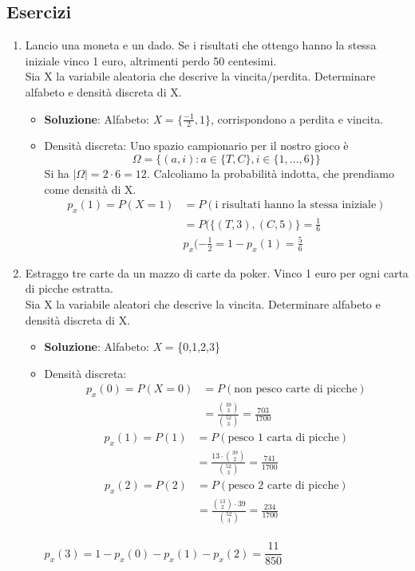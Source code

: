 \documentclass{report}
\begin{document}
\subsection{Esercizi}
\begin{enumerate}
    \item Lancio una moneta e un dado. Se i risultati che ottengo hanno la stessa iniziale vinco 1 euro, altrimenti perdo 50 centesimi.\\ 
    Sia X la variabile aleatoria che descrive la vincita/perdita. Determinare alfabeto e densità discreta di X.
    \begin{itemize}
        \item \textbf{Soluzione}: Alfabeto: \textit{X} = \(\{\frac{-1}{2}, 1\}\), corrispondono a perdita e vincita.\\
    \item Densità discreta: Uno spazio campionario per il nostro gioco è \[\Omega = \{(a,i): a \in \{T,C\}, i \in \{1,...,6\}\}\]
    Si ha \(|\Omega| = 2 \cdot 6 = 12\). Calcoliamo la probabilità indotta, che prendiamo come densità di X.
    \begin{align}
        p_x(1) = P(X = 1) & = P(\text{i risultati hanno la stessa iniziale})\\
        & = P(\{(T,3), (C,5)\} = \frac{1}{6}\\
        & p_x(- \frac{1}{2} = 1 - p_x(1) = \frac{5}{6}
    \end{align}
    \end{itemize}
    \item Estraggo tre carte da un mazzo di carte da poker. Vinco 1 euro per ogni carta di picche estratta.\\
    Sia X la variabile aleatori che descrive la vincita. Determinare alfabeto e densità discreta di X.
    \begin{itemize}
        \item \textbf{Soluzione}: Alfabeto: \textit{X} = \{0,1,2,3\}
        \item Densità discreta:
        \begin{align}
            p_x(0) = P(X = 0) & = P (\text{non pesco carte di picche})\\
            & = \frac{\binom{39}{3}}{\binom{52}{3}} = \frac{703}{1700}
        \end{align}
        \begin{align}
            p_x(1) = P(1) & = P (\text{pesco 1 carta di picche})\\
            & = \frac{13 \cdot \binom{39}{2}}{\binom{52}{3}} = \frac{741}{1700}
        \end{align}
        \begin{align}
            p_x(2) = P(2) & = P (\text{pesco 2 carte di picche})\\
            & = \frac{\binom{13}{2} \cdot 39 }{\binom{52}{3}} = \frac{234}{1700}
        \end{align}\\
        \(p_x(3) = 1 - p_x(0) - p_x(1) -p_x(2) = \dfrac{11}{850}\)
    \end{itemize}
\end{enumerate}
\end{document}

